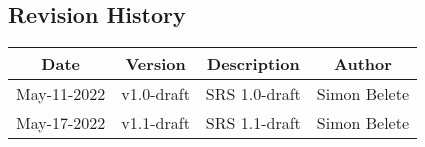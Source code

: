 


\begin{center}
\section*{Revision History}
\end{center}


\doublespacing
\vspace{1.0cm}
\noindent

\begin{center}
\begin{tabular}{ |c|c|c|c| } 
 \hline
 \textbf{Date} & \textbf{Version} & \textbf{Description} & \textbf{Author} \\ 
 \hline
 May-11-2022 & v1.0-draft & SRS 1.0-draft & Simon Belete \\
  \hline
 May-17-2022 & v1.1-draft & SRS 1.1-draft & Simon Belete \\
 \hline
\end{tabular}
\end{center}